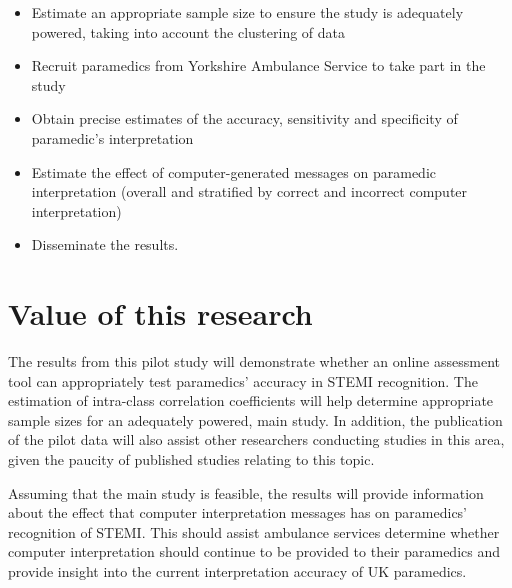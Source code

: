 \begin{itemize}
\item Estimate an appropriate sample size to ensure the study is adequately powered, taking into account the clustering of data

\item Recruit paramedics from Yorkshire Ambulance Service to take part in the study

\item Obtain precise estimates of the accuracy, sensitivity and specificity of paramedic's interpretation

\item Estimate the effect of computer-generated messages on paramedic interpretation (overall and
stratified by correct and incorrect computer interpretation)

\item Disseminate the results.

\end{itemize}

\section{Value of this research}
\label{valueofthisresearch}

The results from this pilot study will demonstrate whether an online assessment tool can appropriately test paramedics' accuracy in STEMI recognition. The estimation of intra-class correlation coefficients will help determine appropriate sample sizes for an adequately powered, main study. In addition, the publication of the pilot data will also assist other researchers conducting studies in this area, given the paucity of published studies relating to this topic.

Assuming that the main study is feasible, the results will provide information about the effect that computer interpretation messages has on paramedics' recognition of STEMI. This should assist ambulance services determine whether computer interpretation should continue to be provided to their paramedics and provide insight into the current interpretation accuracy of UK paramedics. 

